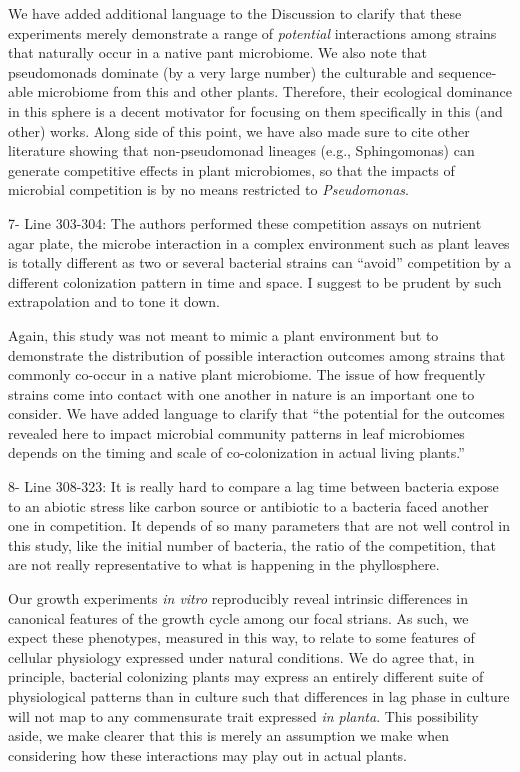 \documentclass[11pt,]{article}
\begin{document}
We have added additional language to the Discussion to clarify that
these experiments merely demonstrate a range of \emph{potential}
interactions among strains that naturally occur in a native pant
microbiome. We also note that pseudomonads dominate (by a very large
number) the culturable and sequence-able microbiome from this and other
plants. Therefore, their ecological dominance in this sphere is a decent
motivator for focusing on them specifically in this (and other) works.
Along side of this point, we have also made sure to cite other
literature showing that non-pseudomonad lineages (e.g., Sphingomonas)
can generate competitive effects in plant microbiomes, so that the
impacts of microbial competition is by no means restricted to
\emph{Pseudomonas}.

\begin{blockquote}
7- Line 303-304: The authors performed these competition assays on
nutrient agar plate, the microbe interaction in a complex environment
such as plant leaves is totally different as two or several bacterial
strains can ``avoid'' competition by a different colonization pattern in
time and space. I suggest to be prudent by such extrapolation and to
tone it down.
\end{blockquote}

Again, this study was not meant to mimic a plant environment but to
demonstrate the distribution of possible interaction outcomes among
strains that commonly co-occur in a native plant microbiome. The issue
of how frequently strains come into contact with one another in nature
is an important one to consider. We have added language to clarify that
``the potential for the outcomes revealed here to impact microbial
community patterns in leaf microbiomes depends on the timing and scale
of co-colonization in actual living plants.''

\begin{blockquote}
8- Line 308-323: It is really hard to compare a lag time between
bacteria expose to an abiotic stress like carbon source or antibiotic to
a bacteria faced another one in competition. It depends of so many
parameters that are not well control in this study, like the initial
number of bacteria, the ratio of the competition, that are not really
representative to what is happening in the phyllosphere.
\end{blockquote}

Our growth experiments \emph{in vitro} reproducibly reveal intrinsic
differences in canonical features of the growth cycle among our focal
strians. As such, we expect these phenotypes, measured in this way, to
relate to some features of cellular physiology expressed under natural
conditions. We do agree that, in principle, bacterial colonizing plants
may express an entirely different suite of physiological patterns than
in culture such that differences in lag phase in culture will not map to
any commensurate trait expressed \emph{in planta}. This possibility
aside, we make clearer that this is merely an assumption we make when
considering how these interactions may play out in actual plants.
\end{document}
